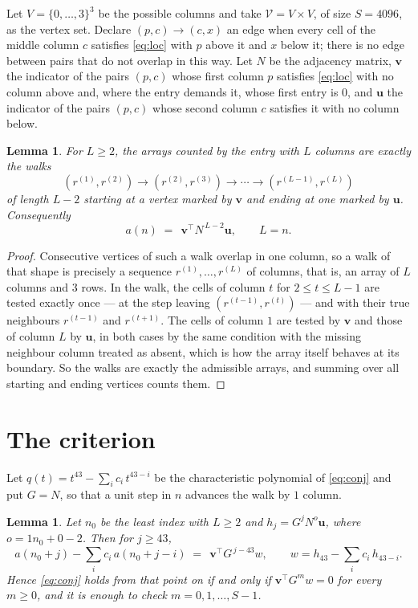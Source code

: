 \documentclass[11pt,a4paper]{article}
\theoremstyle{plain}
\newtheorem{lemma}[theorem]{Lemma}
\theoremstyle{definition}
\begin{document}
Let $V=\{0,\dots,3\}^{3}$ be the possible columns and take
$\mathcal V=V\times V$, of size $S=4096$, as the vertex set. Declare $(p,c)\to(c,x)$ an edge
when every cell of the middle column $c$ satisfies \eqref{eq:loc} with $p$ above it and $x$
below it; there is no edge between pairs that do not overlap in this way. Let $N$ be the
adjacency matrix, $\mathbf{v}$ the indicator of the pairs $(p,c)$ whose first column $p$
satisfies \eqref{eq:loc} with no column above and, where the entry demands it, whose first entry is $0$, and $\mathbf{u}$ the indicator of
the pairs $(p,c)$ whose second column $c$ satisfies it with no column below.

\begin{lemma}\label{lem:walk}
For $L\ge2$, the arrays counted by the entry with $L$ columns are exactly the walks
\[
(r^{(1)},r^{(2)})\to(r^{(2)},r^{(3)})\to\cdots\to(r^{(L-1)},r^{(L)})
\]
of length $L-2$ starting at a vertex marked by $\mathbf{v}$ and ending at one marked by
$\mathbf{u}$. Consequently
\[
a(n)\;=\;\,\mathbf{v}^{\!\top}N^{\,L-2}\mathbf{u},\qquad L=n .
\]
\end{lemma}

\begin{proof}
Consecutive vertices of such a walk overlap in one column, so a walk of that shape is
precisely a sequence $r^{(1)},\dots,r^{(L)}$ of columns, that is, an array of $L$ columns
and $3$ rows. In the walk, the cells of column $t$ for $2\le t\le L-1$ are tested
exactly once --- at the step leaving $(r^{(t-1)},r^{(t)})$ --- and with their true
neighbours $r^{(t-1)}$ and $r^{(t+1)}$. The cells of column $1$ are tested by
$\mathbf{v}$ and those of column $L$ by $\mathbf{u}$, in both cases by the same condition
with the missing neighbour column treated as absent, which is how the array itself behaves at
its boundary. So the walks are exactly the admissible arrays, and summing over all starting
and ending vertices counts them.
\end{proof}

\section{The criterion}

Let $q(t)=t^{43}-\sum_i c_i\,t^{43-i}$ be the characteristic polynomial of
\eqref{eq:conj} and put $G=N$, so that a unit step in $n$ advances the walk by
$1$ column.

\begin{lemma}\label{lem:crit}
Let $n_0$ be the least index with $L\ge2$ and $h_j=G^{j}N^{o}\mathbf{u}$, where
$o=1n_0+0-2$. Then for $j\ge43$,
\[
a(n_0+j)-\sum_i c_i\,a(n_0+j-i)\;=\;\,\mathbf{v}^{\!\top}G^{\,j-43}w,
\qquad w=h_{43}-\sum_i c_i\,h_{43-i} .
\]
Hence \eqref{eq:conj} holds from that point on if and only if
$\mathbf{v}^{\!\top}G^{m}w=0$ for every $m\ge0$, and it is enough to check
$m=0,1,\dots,S-1$.
\end{lemma}
\end{document}
